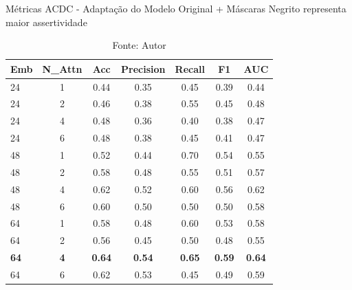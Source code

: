 \begin{table}[htbp]
\centering
\caption{Métricas ACDC - Adaptação do Modelo Original + Máscaras
\newline Negrito representa maior assertividade}
\begin{tabular}{lcccccc}
\toprule
\textbf{Emb} & \textbf{N\_Attn} & \textbf{Acc} & \textbf{Precision} & \textbf{Recall} & \textbf{F1} & \textbf{AUC} \\
\midrule
24 & 1 & 0.44 & 0.35 & 0.45 & 0.39 & 0.44 \\
24 & 2 & 0.46 & 0.38 & 0.55 & 0.45 & 0.48 \\
24 & 4 & 0.48 & 0.36 & 0.40 & 0.38 & 0.47 \\
24 & 6 & 0.48 & 0.38 & 0.45 & 0.41 & 0.47 \\
\hline
48 & 1 & 0.52 & 0.44 & 0.70 & 0.54 & 0.55 \\
48 & 2 & 0.58 & 0.48 & 0.55 & 0.51 & 0.57 \\
48 & 4 & 0.62 & 0.52 & 0.60 & 0.56 & 0.62 \\
48 & 6 & 0.60 & 0.50 & 0.50 & 0.50 & 0.58 \\
\hline
64 & 1 & 0.58 & 0.48 & 0.60 & 0.53 & 0.58 \\
64 & 2 & 0.56 & 0.45 & 0.50 & 0.48 & 0.55 \\
\textbf{64} & \textbf{4} & \textbf{0.64} & \textbf{0.54} & \textbf{0.65} & \textbf{0.59} & \textbf{0.64} \\
64 & 6 & 0.62 & 0.53 & 0.45 & 0.49 & 0.59 \\
\bottomrule
\end{tabular}
\caption*{Fonte: Autor}
\label{tab:metrics_acdc_orig_mask}
\end{table}



